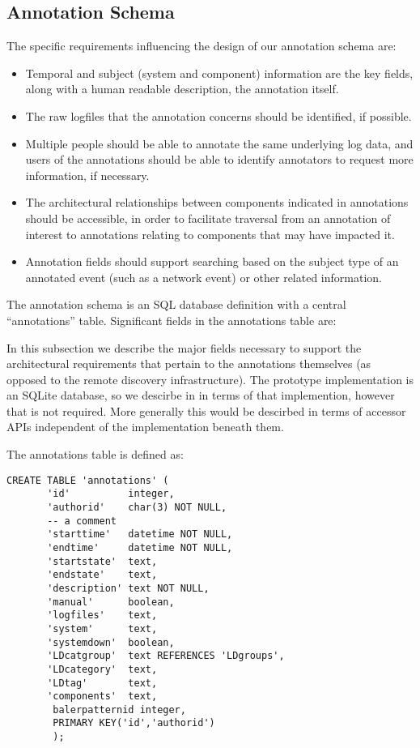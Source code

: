 \subsection{Annotation Schema}

The specific requirements influencing the design of our annotation schema
are:

\begin{itemize}
\item Temporal and subject (system and component) information are 
      the key fields, along with a human readable description, the 
      annotation itself.
\item The raw logfiles that the annotation concerns should be identified,
      if possible.
\item Multiple people should be able to annotate the same underlying 
      log data, and users of the annotations should be able to 
      identify annotators to request more information, if necessary.  
\item The architectural relationships between components indicated in 
      annotations should be accessible, in order to facilitate 
      traversal from an annotation of interest to annotations relating to
      components that may have impacted it.
\item Annotation fields should support searching based on the subject type 
      of an annotated event (such as a network event) or other 
      related information.
\end{itemize}

The annotation schema is an SQL database definition with a central ``annotations'' table. Significant fields in the annotations table are:


In this subsection we describe the major fields necessary to support the
architectural requirements that pertain to the annotations themselves
(as opposed to the remote discovery infrastructure). The prototype
implementation is an SQLite database, so we descirbe in in terms
of that implemention, however that is not required. More generally
this would be descirbed in terms of accessor APIs independent of
the implementation beneath them.

The annotations table is defined as:
\begin{small}
\begin{verbatim}
CREATE TABLE 'annotations' (
       'id'          integer,
       'authorid'    char(3) NOT NULL,
       -- a comment
       'starttime'   datetime NOT NULL,
       'endtime'     datetime NOT NULL,
       'startstate'  text,
       'endstate'    text,
       'description' text NOT NULL,
       'manual'      boolean,
       'logfiles'    text,
       'system'      text,
       'systemdown'  boolean,
       'LDcatgroup'  text REFERENCES 'LDgroups',
       'LDcategory'  text,
       'LDtag'       text,
       'components'  text,
        balerpatternid integer,
        PRIMARY KEY('id','authorid')
        );
\end{verbatim}
\end{small}


